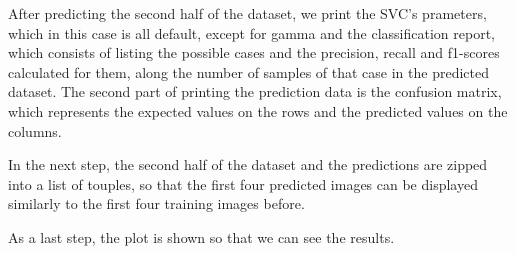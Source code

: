 \documentclass[a4paper,10pt]{report}
\begin{document}
 After predicting the second half of the dataset, we print the SVC's prameters, which in this case is all default, except for gamma and the classification report, which consists of listing the possible cases and the precision, recall and f1-scores calculated for them, along the number of samples of that case in the predicted dataset. The second part of printing the prediction data is the confusion matrix, which represents the expected values on the rows and the predicted values on the columns.
 
 In the next step, the second half of the dataset and the predictions are zipped into a list of touples, so that the first four predicted images can be displayed similarly to the first four training images before.
 
 As a last step, the plot is shown so that we can see the results.
 
\end{document}
